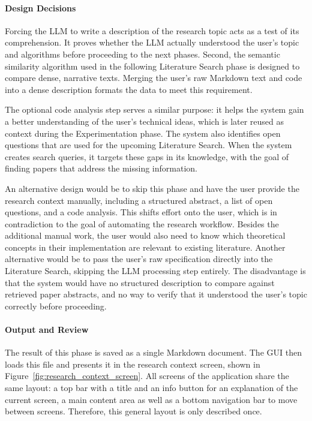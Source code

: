 \paragraph{Design Decisions}
Forcing the LLM to write a description of the research topic acts as a test of its comprehension. 
It proves whether the LLM actually understood the user's topic and algorithms before proceeding to the next phases.
Second, the semantic similarity algorithm used in the following Literature Search phase is designed to compare dense, narrative texts. 
Merging the user's raw Markdown text and code into a dense description formats the data to meet this requirement.

The optional code analysis step serves a similar purpose: it helps the system gain a better understanding of the user's technical ideas, which is later reused as context during the Experimentation phase. 
The system also identifies open questions that are used for the upcoming Literature Search. 
When the system creates search queries, it targets these gaps in its knowledge, with the goal of finding papers that address the missing information.

An alternative design would be to skip this phase and have the user provide the research context manually, including a structured abstract, a list of open questions, and a code analysis. 
This shifts effort onto the user, which is in contradiction to the goal of automating the research workflow. 
Besides the additional manual work, the user would also need to know which theoretical concepts in their implementation are relevant to existing literature.
Another alternative would be to pass the user's raw specification directly into the Literature Search, skipping the LLM processing step entirely. 
The disadvantage is that the system would have no structured description to compare against retrieved paper abstracts, and no way to verify that it understood the user's topic correctly before proceeding.

\paragraph{Output and Review}
The result of this phase is saved as a single Markdown document. 
The GUI then loads this file and presents it in the research context screen, shown in Figure~\ref{fig:research_context_screen}. 
All screens of the application share the same layout: a top bar with a title and an info button for an explanation of the current screen, a main content area as well as a bottom navigation bar to move between screens.
Therefore, this general layout is only described once.

